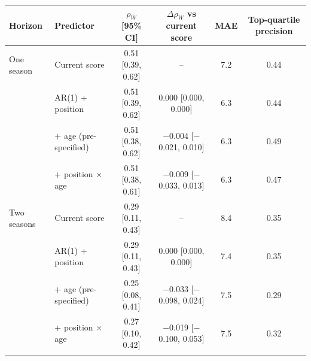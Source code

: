 \begin{tabular}{llcccc}
\toprule
Horizon & Predictor & $\rho_W$ [95\% CI] & $\Delta\rho_W$ vs current score & MAE & Top-quartile precision \\
\midrule
One season & Current score & 0.51 [0.39, 0.62] & -- & 7.2 & 0.44 \\
 & AR(1) + position & 0.51 [0.39, 0.62] & 0.000 [0.000, 0.000] & 6.3 & 0.44 \\
 & + age (pre-specified) & 0.51 [0.38, 0.62] & $-$0.004 [$-$0.021, 0.010] & 6.3 & 0.49 \\
 & + position $\times$ age & 0.51 [0.38, 0.61] & $-$0.009 [$-$0.033, 0.013] & 6.3 & 0.47 \\
\addlinespace
Two seasons & Current score & 0.29 [0.11, 0.43] & -- & 8.4 & 0.35 \\
 & AR(1) + position & 0.29 [0.11, 0.43] & 0.000 [0.000, 0.000] & 7.4 & 0.35 \\
 & + age (pre-specified) & 0.25 [0.08, 0.41] & $-$0.033 [$-$0.098, 0.024] & 7.5 & 0.29 \\
 & + position $\times$ age & 0.27 [0.10, 0.42] & $-$0.019 [$-$0.100, 0.053] & 7.5 & 0.32 \\
\addlinespace
\bottomrule
\end{tabular}
